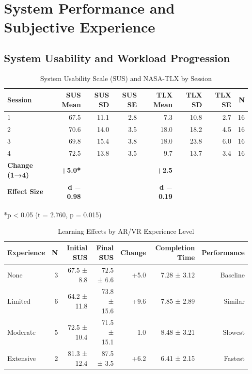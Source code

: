\section{System Performance and Subjective Experience}
\label{appendix:results:subjective}

\subsection{System Usability and Workload Progression}
\label{appendix:subjective}

\begin{table}[H]
\centering
\caption{System Usability Scale (SUS) and NASA-TLX by Session}
\label{tab:sus_tlx_complete}
\begin{tabular}{lrrrrrrr}
\toprule
\textbf{Session} & \textbf{SUS Mean} & \textbf{SUS SD} & \textbf{SUS SE} & \textbf{TLX Mean} & \textbf{TLX SD} & \textbf{TLX SE} & \textbf{N} \\
\midrule
1 & 67.5 & 11.1 & 2.8 & 7.3 & 10.8 & 2.7 & 16 \\
2 & 70.6 & 14.0 & 3.5 & 18.0 & 18.2 & 4.5 & 16 \\
3 & 69.8 & 15.4 & 3.8 & 18.0 & 23.8 & 6.0 & 16 \\
4 & 72.5 & 13.8 & 3.5 & 9.7 & 13.7 & 3.4 & 16 \\
\midrule
\textbf{Change (1→4)} & \textbf{+5.0*} & & & \textbf{+2.5} & & & \\
\textbf{Effect Size} & \textbf{d = 0.98} & & & \textbf{d = 0.19} & & & \\
\bottomrule
\end{tabular}
\small
*p < 0.05 (t = 2.760, p = 0.015)
\end{table}

\begin{table}[H]
\centering
\caption{Learning Effects by AR/VR Experience Level}
\label{tab:experience_learning_complete}
\begin{tabular}{lrrrrrr}
\toprule
\textbf{Experience} & \textbf{N} & \textbf{Initial SUS} & \textbf{Final SUS} & \textbf{Change} & \textbf{Completion Time} & \textbf{Performance} \\
\midrule
None & 3 & 67.5 ± 8.8 & 72.5 ± 6.6 & +5.0 & 7.28 ± 3.12 & Baseline \\
Limited & 6 & 64.2 ± 11.8 & 73.8 ± 15.6 & +9.6 & 7.85 ± 2.89 & Similar \\
Moderate & 5 & 72.5 ± 10.4 & 71.5 ± 15.1 & -1.0 & 8.48 ± 3.21 & Slowest \\
Extensive & 2 & 81.3 ± 12.4 & 87.5 ± 3.5 & +6.2 & 6.41 ± 2.15 & Fastest \\
\bottomrule
\end{tabular}
\end{table}

